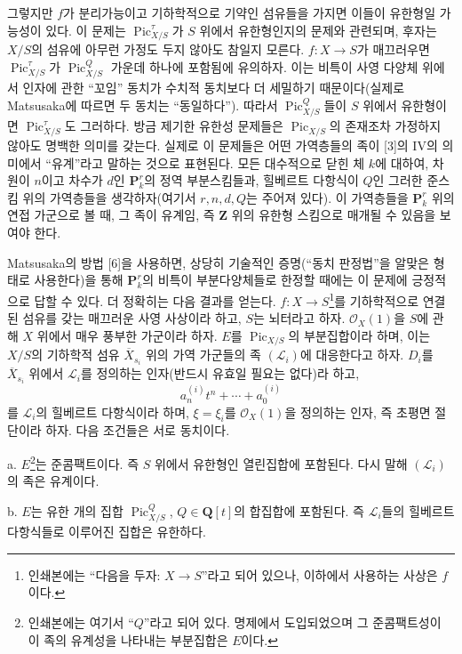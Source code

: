 그렇지만 $f$가 분리가능이고 기하학적으로 기약인 섬유들을 가지면 이들이
유한형일 가능성이 있다. 이 문제는 $\operatorname{Pic}_{X/S}^\tau$가 $S$
위에서 유한형인지의 문제와 관련되며, 후자는 $X/S$의 섬유에 아무런 가정도
두지 않아도 참일지 모른다. $f:X\longrightarrow S$가 매끄러우면
$\operatorname{Pic}_{X/S}^\tau$가 $\operatorname{Pic}_{X/S}^Q$ 가운데
하나에 포함됨에 유의하자. 이는 비특이 사영 다양체 위에서 인자에 관한
``꼬임'' 동치가 수치적 동치보다 더 세밀하기 때문이다(실제로 Matsusaka에
따르면 두 동치는 ``동일하다''). 따라서 $\operatorname{Pic}_{X/S}^Q$들이
$S$ 위에서 유한형이면 $\operatorname{Pic}_{X/S}^\tau$도 그러하다. 방금
제기한 유한성 문제들은 $\operatorname{Pic}_{X/S}$의 존재조차 가정하지
않아도 명백한 의미를 갖는다. 실제로 이 문제들은 어떤 가역층들의 족이
[3]의 IV의 의미에서 ``유계''라고 말하는 것으로 표현된다. 모든 대수적으로
닫힌 체 $k$에 대하여, 차원이 $n$이고 차수가 $d$인 $\mathbf P_k^r$의 정역
부분스킴들과, 힐베르트 다항식이 $Q$인 그러한 준스킴 위의 가역층들을
생각하자(여기서 $r,n,d,Q$는 주어져 있다). 이 가역층들을
$\mathbf P_k^r$ 위의 연접 가군으로 볼 때, 그 족이 유계임, 즉 $\mathbf Z$
위의 유한형 스킴으로 매개될 수 있음을 보여야 한다.

Matsusaka의 방법 [6]을 사용하면, 상당히 기술적인 증명(``동치 판정법''을
알맞은 형태로 사용한다)을 통해 $\mathbf P_k^r$의 비특이 부분다양체들로
한정할 때에는 이 문제에 긍정적으로 답할 수 있다. 더 정확히는 다음 결과를
얻는다.
 $f:X\longrightarrow S$\footnote{인쇄본에는
``다음을 두자: $X\longrightarrow S$''라고 되어 있으나, 이하에서 사용하는
사상은 $f$이다.}를 기하학적으로 연결된 섬유를 갖는 매끄러운 사영 사상이라
하고, $S$는 뇌터라고 하자. $\mathcal O_X(1)$을 $S$에 관해 $X$ 위에서 매우
풍부한 가군이라 하자. $E$를 $\operatorname{Pic}_{X/S}$의 부분집합이라 하며,
이는 $X/S$의 기하학적 섬유 $\overline X_{s_i}$ 위의 가역 가군들의 족
$(\mathcal L_i)$에 대응한다고 하자. $D_i$를 $\overline X_{s_i}$ 위에서
$\mathcal L_i$를 정의하는 인자(반드시 유효일 필요는 없다)라 하고,
\[
a_n^{(i)}t^n+\cdots+a_0^{(i)}
\]
를 $\mathcal L_i$의 힐베르트 다항식이라 하며, $\xi=\xi_i$를
$\mathcal O_X(1)$을 정의하는 인자, 즉 초평면 절단이라 하자. 다음 조건들은
서로 동치이다.

\noindent a. $E$\footnote{인쇄본에는 여기서 ``$Q$''라고 되어 있다. 명제에서
도입되었으며 그 준콤팩트성이 이 족의 유계성을 나타내는 부분집합은
$E$이다.}는 준콤팩트이다. 즉 $S$ 위에서 유한형인 열린집합에 포함된다.
다시 말해 $(\mathcal L_i)$의 족은 유계이다.

\noindent b. $E$는 유한 개의 집합 $\operatorname{Pic}_{X/S}^Q$,
$Q\in\mathbf Q[t]$의 합집합에 포함된다. 즉 $\mathcal L_i$들의 힐베르트
다항식들로 이루어진 집합은 유한하다.

